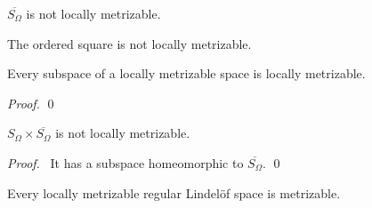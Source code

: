 \begin{cor}
  $\overline{S_\Omega}$ is not locally metrizable.
\end{cor}

\begin{cor}
  The ordered square is not locally metrizable.
\end{cor}

\begin{prop}
  Every subspace of a locally metrizable space is locally metrizable.
\end{prop}

\begin{proof}
  \pf
  \qed
\end{proof}

\begin{cor}
  $S_\Omega \times \overline{S_\Omega}$ is not locally metrizable.
\end{cor}

\begin{proof}
  \pf\ It has a subspace homeomorphic to $\overline{S_\Omega}$. \qed
\end{proof}

\begin{prop}[CC]
  Every locally metrizable regular Lindel\"{o}f space is metrizable.
\end{prop}


